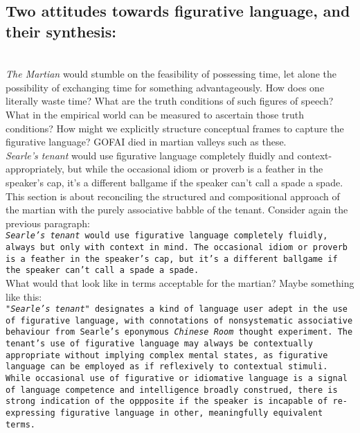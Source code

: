 \subsection{Two attitudes towards figurative language, and their synthesis:}\\

\emph{The Martian} would stumble on the feasibility of possessing time, let alone the possibility of exchanging time for something advantageously. How does one literally waste time? What are the truth conditions of such figures of speech? What in the empirical world can be measured to ascertain those truth conditions? How might we explicitly structure conceptual frames to capture the figurative language? GOFAI died in martian valleys such as these.\\

\emph{Searle's tenant} would use figurative language completely fluidly and context-appropriately, but while the occasional idiom or proverb is a feather in the speaker's cap, it's a different ballgame if the speaker can't call a spade a spade.\\

This section is about reconciling the structured and compositional approach of the martian with the purely associative babble of the tenant. Consider again the previous paragraph:\\

\texttt{\emph{Searle's tenant} would use figurative language completely fluidly, always but only with context in mind. The occasional idiom or proverb is a feather in the speaker's cap, but it's a different ballgame if the speaker can't call a spade a spade.}\\

What would that look like in terms acceptable for the martian? Maybe something like this:\\

\texttt{"\emph{Searle's tenant}" designates a kind of language user adept in the use of figurative language, with connotations of nonsystematic associative behaviour from Searle's eponymous \emph{Chinese Room} thought experiment. The tenant's use of figurative language may always be contextually appropriate without implying complex mental states, as figurative language can be employed as if reflexively to contextual stimuli. While occasional use of figurative or idiomative language is a signal of language competence and intelligence broadly construed, there is strong indication of the oppposite if the speaker is incapable of re-expressing figurative language in other, meaningfully equivalent terms.}